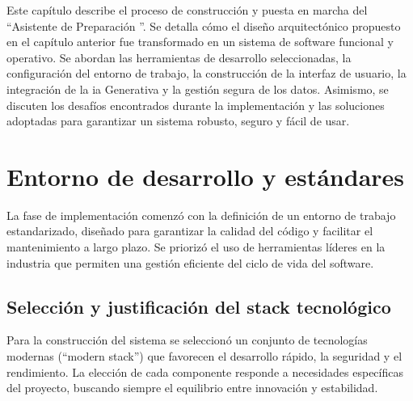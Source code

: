Este capítulo describe el proceso de construcción y puesta en marcha del \enquote{Asistente de Preparación }. Se detalla cómo el diseño arquitectónico propuesto en el capítulo anterior fue transformado en un sistema de software funcional y operativo. Se abordan las herramientas de desarrollo seleccionadas, la configuración del entorno de trabajo, la construcción de la interfaz de usuario, la integración de la \gls{ia} Generativa y la gestión segura de los datos. Asimismo, se discuten los desafíos encontrados durante la implementación y las soluciones adoptadas para garantizar un sistema robusto, seguro y fácil de usar.

\section{Entorno de desarrollo y estándares}

La fase de implementación comenzó con la definición de un entorno de trabajo estandarizado, diseñado para garantizar la calidad del código y facilitar el mantenimiento a largo plazo. Se priorizó el uso de herramientas líderes en la industria que permiten una gestión eficiente del ciclo de vida del software.

\subsection{Selección y justificación del stack tecnológico}
Para la construcción del sistema se seleccionó un conjunto de tecnologías modernas (\enquote{modern stack}) que favorecen el desarrollo rápido, la seguridad y el rendimiento. La elección de cada componente responde a necesidades específicas del proyecto, buscando siempre el equilibrio entre innovación y estabilidad.


